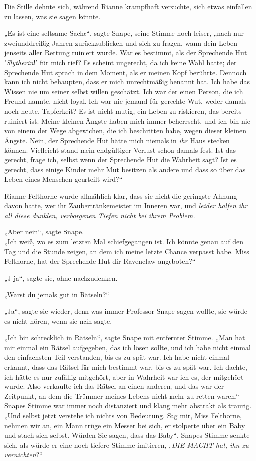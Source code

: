 {Die Stille dehnte sich, während Rianne krampfhaft versuchte, sich etwas einfallen zu lassen, was sie sagen könnte.

„Es ist eine seltsame Sache“, sagte Snape, seine Stimme noch leiser, „nach nur zweiunddreißig Jahren zurückzublicken und sich zu fragen, wann dein Leben jenseits aller Rettung ruiniert wurde. War es bestimmt, als der Sprechende Hut '\emph{Slytherin}!' für mich rief? Es scheint ungerecht, da ich keine Wahl hatte; der Sprechende Hut sprach in dem Moment, als er meinen Kopf berührte. Dennoch kann ich nicht behaupten, dass er mich unrechtmäßig benannt hat. Ich habe das Wissen nie um seiner selbst willen geschätzt. Ich war der einen Person, die ich Freund nannte, nicht loyal. Ich war nie jemand für gerechte Wut, weder damals noch heute. Tapferkeit? Es ist nicht mutig, ein Leben zu riskieren, das bereits ruiniert ist. Meine kleinen Ängste haben mich immer beherrscht, und ich bin nie von einem der Wege abgewichen, die ich beschritten habe, wegen dieser kleinen Ängste. Nein, der Sprechende Hut hätte mich niemals in \emph{ihr} Haus stecken können. Vielleicht stand mein endgültiger Verlust schon damals fest. Ist das gerecht, frage ich, selbst wenn der Sprechende Hut die Wahrheit sagt? Ist es gerecht, dass einige Kinder mehr Mut besitzen als andere und dass so über das Leben eines Menschen geurteilt wird?“

Rianne Felthorne wurde allmählich klar, dass sie nicht die geringste Ahnung davon hatte, wer ihr Zaubertränkemeister im Inneren war, und \emph{leider halfen ihr all diese dunklen, verborgenen Tiefen nicht bei ihrem Problem.}

„Aber nein“, sagte Snape.\\ „Ich weiß, wo es zum letzten Mal schiefgegangen ist. Ich könnte genau auf den Tag und die Stunde zeigen, an dem ich meine letzte Chance verpasst habe. Miss Felthorne, hat der Sprechende Hut dir Ravenclaw angeboten?“

„J-ja“, sagte sie, ohne nachzudenken.

„Warst du jemals gut in Rätseln?“

„Ja“, sagte sie wieder, denn was immer Professor Snape sagen wollte, sie würde es nicht hören, wenn sie nein sagte.

„Ich bin schrecklich in Rätseln“, sagte Snape mit entfernter Stimme. „Man hat mir einmal ein Rätsel aufgegeben, das ich lösen sollte, und ich habe nicht einmal den einfachsten Teil verstanden, bis es zu spät war. Ich habe nicht einmal erkannt, dass das Rätsel für mich bestimmt war, bis es zu spät war. Ich dachte, ich hätte es nur zufällig mitgehört, aber in Wahrheit war ich es, der mitgehört wurde. Also verkaufte ich das Rätsel an einen anderen, und das war der Zeitpunkt, an dem die Trümmer meines Lebens nicht mehr zu retten waren.“\\ Snapes Stimme war immer noch distanziert und klang mehr abstrakt als traurig.\\ „Und selbst jetzt verstehe ich nichts von Bedeutung. Sag mir, Miss Felthorne, nehmen wir an, ein Mann trüge ein Messer bei sich, er stolperte über ein Baby und stach sich selbst. Würden Sie sagen, dass das Baby“, Snapes Stimme senkte sich, als würde er eine noch tiefere Stimme imitieren, „\emph{DIE MACHT hat, ihn zu vernichten}?“

}

